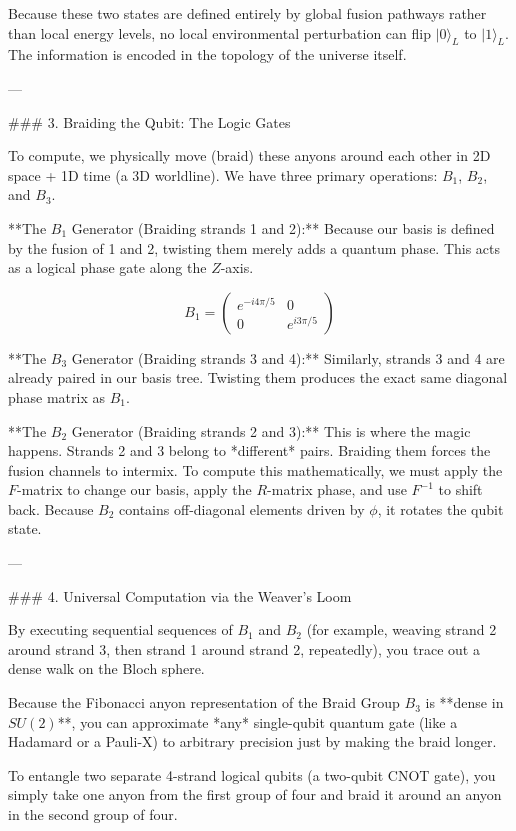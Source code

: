 Because these two states are defined entirely by global fusion pathways rather than local energy levels, no local environmental perturbation can flip $\vert 0 \rangle_L$ to $\vert 1 \rangle_L$. The information is encoded in the topology of the universe itself.

---

### 3. Braiding the Qubit: The Logic Gates

To compute, we physically move (braid) these anyons around each other in 2D space + 1D time (a 3D worldline). We have three primary operations: $B_1$, $B_2$, and $B_3$.

**The $B_1$ Generator (Braiding strands 1 and 2):**
Because our basis is defined by the fusion of 1 and 2, twisting them merely adds a quantum phase. This acts as a logical phase gate along the $Z$-axis.


$$B_1 = \begin{pmatrix} e^{-i 4\pi/5} & 0 \\ 0 & e^{i 3\pi/5} \end{pmatrix}$$

**The $B_3$ Generator (Braiding strands 3 and 4):**
Similarly, strands 3 and 4 are already paired in our basis tree. Twisting them produces the exact same diagonal phase matrix as $B_1$.

**The $B_2$ Generator (Braiding strands 2 and 3):**
This is where the magic happens. Strands 2 and 3 belong to *different* pairs. Braiding them forces the fusion channels to intermix. To compute this mathematically, we must apply the $F$-matrix to change our basis, apply the $R$-matrix phase, and use $F^{-1}$ to shift back.
Because $B_2$ contains off-diagonal elements driven by $\phi$, it rotates the qubit state.

---

### 4. Universal Computation via the Weaver's Loom

By executing sequential sequences of $B_1$ and $B_2$ (for example, weaving strand 2 around strand 3, then strand 1 around strand 2, repeatedly), you trace out a dense walk on the Bloch sphere.

Because the Fibonacci anyon representation of the Braid Group $B_3$ is **dense in $SU(2)$**, you can approximate *any* single-qubit quantum gate (like a Hadamard or a Pauli-X) to arbitrary precision just by making the braid longer.

To entangle two separate 4-strand logical qubits (a two-qubit CNOT gate), you simply take one anyon from the first group of four and braid it around an anyon in the second group of four.

